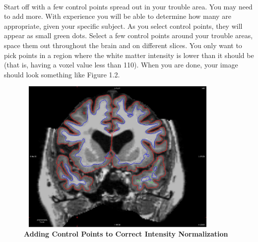 \documentclass[paper=a4, fontsize=11pt]{scrartcl} %
\numberwithin{equation}{section} %
\numberwithin{figure}{section} %
\numberwithin{table}{section} %
\begin{document}
\paragraph{}Start off with a few control points spread out in your trouble area. You may need to add more. With experience you will be able to determine how many are appropriate, given your specific subject.  As you select control points, they will appear as small green dots. Select a few control points around your trouble areas, space them out throughout the brain and on different slices. You only want to pick points in a region where the white matter intensity is lower than it should be (that is, having a voxel value less than 110).  When you are done, your image should look something like Figure 1.2.
\begin{centering}
\begin{figure}[h]
\includegraphics[width=10cm, height=7.5cm]{FS_cp_before_with}
\caption{\textbf{Adding Control Points to Correct Intensity Normalization}}
\end{figure}
\end{centering}
\end{document}
